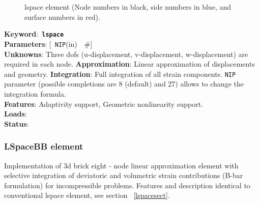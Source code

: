 \documentclass[a4paper]{article}
\newcommand{\descitem}[1]{{\noindent \bf #1}:}
\newcommand{\elemkeyword}[1]{\descitem{Keyword}~{\bf \texttt{#1}}}
\newcommand{\elemparam}[2]{{{\texttt{#1}\tiny (#2)}~~\#}}
\newcommand{\optelemparam}[2]{{[~\elemparam{#1}{#2}]}}
\newcommand{\param}[1]{{\texttt{#1}}}
\begin{document}
\begin{figure}[tb]
\fi
\caption{lspace element (Node numbers in black, side numbers in blue,
and surface numbers in red).}
\end{figure}

\elemkeyword{lspace}\\
\descitem{Parameters} \optelemparam{NIP}{in}\\
\descitem{Unknowns}
Three dofs (u-displacement, v-displacement, w-displacement) are required in each node.
\descitem{Approximation} Linear approximation of displacements and
geometry.
\descitem{Integration}
Full integration of all strain components.
\param{NIP} parameter (possible completions are 8 (default) and 27)
allows to change the integration formula.\\
\descitem{Features} Adaptivity support, Geometric nonlinearity support.\\
\descitem{Loads} \\
\descitem{Status} 

\subsubsection{LSpaceBB element}
Implementation of 3d brick  eight - node 
linear approximation element with selective integration of deviatoric and volumetric strain contributions (B-bar formulation) for incompressible problems. Features and description identical to conventional lspace element, see section ~\ref{lspacesect}.
\end{document}
